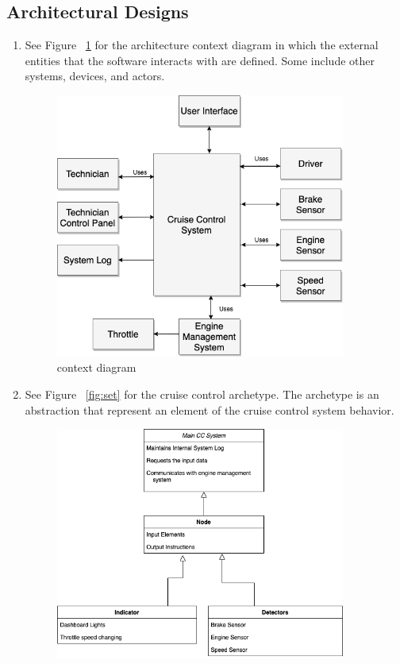 \documentclass[preprint,11pt,3p]{article}
\begin{document}
\subsection{Architectural Designs} 
\begin{enumerate}
	\item See Figure ~\ref{fig:context} for the architecture context diagram in which the external entities that the software interacts with are defined. Some include other systems, devices, and actors.
		\begin{figure}[H]
			\includegraphics[width=0.9\textwidth]{images/Architectural_Context_Diagram.png}
			\caption{context diagram}
			\label{fig:context}
		\end{figure}
		\newpage
	\item See Figure ~\ref{fig:set} for the cruise control archetype. The archetype is an abstraction that represent an element of the cruise control system behavior.
				\begin{figure}[H]
					\includegraphics[width=0.9\textwidth]{images/classMapCS347_set.png}

\end{figure}
\end{enumerate}
\end{document}
